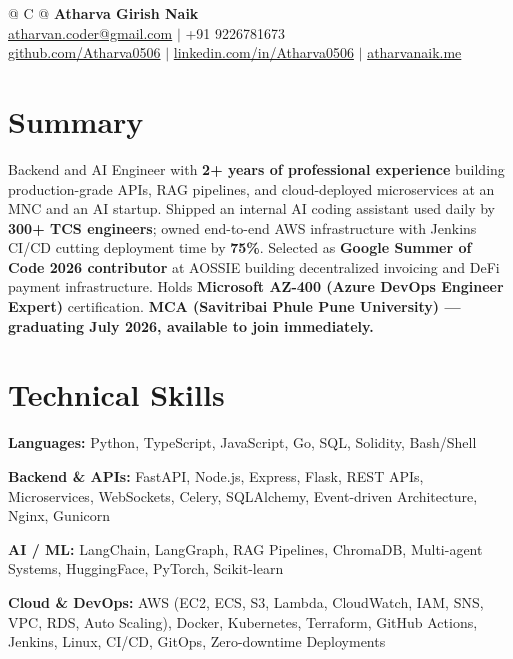 \documentclass[a4paper,10pt]{article}
\begin{document}
\pagestyle{empty}

\begin{tabularx}{\linewidth}{@{} C @{}}
{\Large\textbf{Atharva Girish Naik}} \\[2pt]
\href{mailto:atharvan.coder@gmail.com}{atharvan.coder@gmail.com} $|$ +91 9226781673 \\[1pt]
\href{https://github.com/Atharva0506}{github.com/Atharva0506} $|$
\href{https://linkedin.com/in/Atharva0506}{linkedin.com/in/Atharva0506} $|$
\href{https://atharvanaik.me/}{atharvanaik.me}
\end{tabularx}
\vspace{-6pt}

\section{Summary}
Backend and AI Engineer with \textbf{2+ years of professional experience} building production-grade APIs, RAG pipelines, and cloud-deployed microservices at an MNC and an AI startup. Shipped an internal AI coding assistant used daily by \textbf{300+ TCS engineers}; owned end-to-end AWS infrastructure with Jenkins CI/CD cutting deployment time by \textbf{75\%}. Selected as \textbf{Google Summer of Code 2026 contributor} at AOSSIE building decentralized invoicing and DeFi payment infrastructure. Holds \textbf{Microsoft AZ-400 (Azure DevOps Engineer Expert)} certification. \textbf{MCA (Savitribai Phule Pune University) --- graduating July 2026, available to join immediately.}

\section{Technical Skills}

\textbf{Languages:} Python, TypeScript, JavaScript, Go, SQL, Solidity, Bash/Shell

\textbf{Backend \& APIs:} FastAPI, Node.js, Express, Flask, REST APIs, Microservices, WebSockets, Celery, SQLAlchemy, Event-driven Architecture, Nginx, Gunicorn

\textbf{AI / ML:} LangChain, LangGraph, RAG Pipelines, ChromaDB, Multi-agent Systems, HuggingFace, PyTorch, Scikit-learn

\textbf{Cloud \& DevOps:} AWS (EC2, ECS, S3, Lambda, CloudWatch, IAM, SNS, VPC, RDS, Auto Scaling), Docker, Kubernetes, Terraform, GitHub Actions, Jenkins, Linux, CI/CD, GitOps, Zero-downtime Deployments
\end{document}
